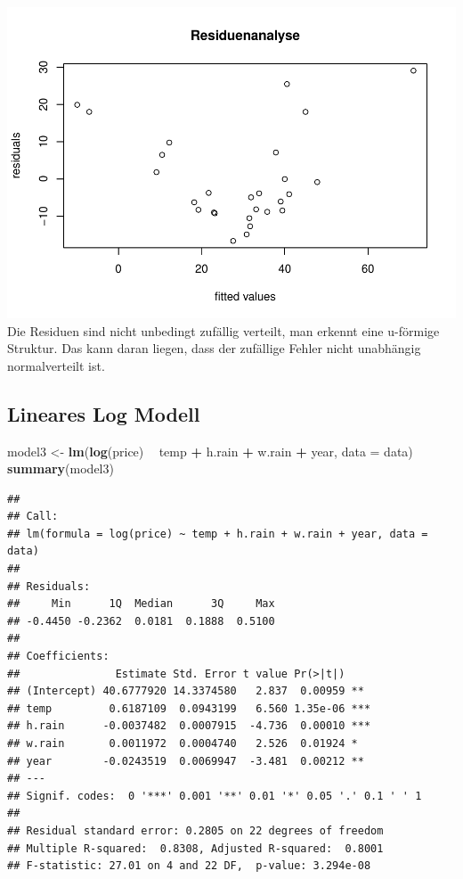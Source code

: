 \documentclass[]{article}
\newenvironment{Shaded}{\begin{snugshade}}{\end{snugshade}}
\newcommand{\DataTypeTok}[1]{\textcolor[rgb]{0.13,0.29,0.53}{#1}}
\newcommand{\KeywordTok}[1]{\textcolor[rgb]{0.13,0.29,0.53}{\textbf{#1}}}
\newcommand{\NormalTok}[1]{#1}
\newcommand{\OperatorTok}[1]{\textcolor[rgb]{0.81,0.36,0.00}{\textbf{#1}}}
\newcommand{\StringTok}[1]{\textcolor[rgb]{0.31,0.60,0.02}{#1}}
\begin{document}
\includegraphics{Test_files/figure-latex/unnamed-chunk-20-1.pdf}
Die Residuen sind nicht unbedingt zufällig verteilt, man erkennt eine u-förmige Struktur. Das kann daran liegen, dass der
zufällige Fehler nicht unabhängig normalverteilt ist.

\hypertarget{lineares-log-modell}{%
\subsection{Lineares Log Modell}\label{lineares-log-modell}}

\begin{Shaded}
\begin{Highlighting}[]
\NormalTok{model3 <-}\StringTok{ }\KeywordTok{lm}\NormalTok{(}\KeywordTok{log}\NormalTok{(price) }\OperatorTok{~}\StringTok{ }\NormalTok{temp }\OperatorTok{+}\StringTok{ }\NormalTok{h.rain }\OperatorTok{+}\StringTok{ }\NormalTok{w.rain }\OperatorTok{+}\StringTok{ }\NormalTok{year, }\DataTypeTok{data =}\NormalTok{ data)}
\KeywordTok{summary}\NormalTok{(model3)}
\end{Highlighting}
\end{Shaded}

\begin{verbatim}
## 
## Call:
## lm(formula = log(price) ~ temp + h.rain + w.rain + year, data = data)
## 
## Residuals:
##     Min      1Q  Median      3Q     Max 
## -0.4450 -0.2362  0.0181  0.1888  0.5100 
## 
## Coefficients:
##               Estimate Std. Error t value Pr(>|t|)    
## (Intercept) 40.6777920 14.3374580   2.837  0.00959 ** 
## temp         0.6187109  0.0943199   6.560 1.35e-06 ***
## h.rain      -0.0037482  0.0007915  -4.736  0.00010 ***
## w.rain       0.0011972  0.0004740   2.526  0.01924 *  
## year        -0.0243519  0.0069947  -3.481  0.00212 ** 
## ---
## Signif. codes:  0 '***' 0.001 '**' 0.01 '*' 0.05 '.' 0.1 ' ' 1
## 
## Residual standard error: 0.2805 on 22 degrees of freedom
## Multiple R-squared:  0.8308, Adjusted R-squared:  0.8001 
## F-statistic: 27.01 on 4 and 22 DF,  p-value: 3.294e-08
\end{verbatim}
\end{document}
